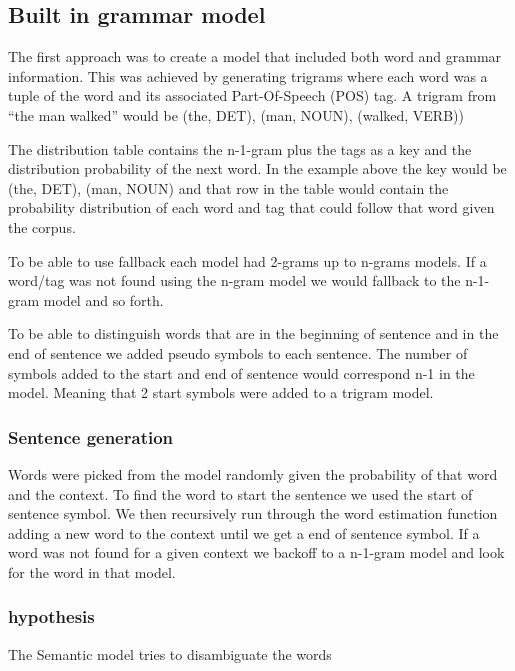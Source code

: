 \documentclass[a4paper,12pt]{article}
\begin{document}
\subsection{Built in grammar model}
The first approach was to create a model that included both word and grammar information. This was achieved by generating trigrams where each word was a tuple of the word and its associated Part-Of-Speech (POS) tag. A trigram from ``the man walked'' would be (the, DET), (man, NOUN), (walked, VERB))

The distribution table contains the n-1-gram plus the tags as a key and the distribution probability of the next word. In the example above the key would be (the, DET), (man, NOUN) and that row in the table would contain the probability distribution of each word and tag that could follow that word given the corpus.

To be able to use fallback each model had 2-grams up to n-grams models. If a word/tag was not found using the n-gram model we would fallback to the n-1-gram model and so forth.

To be able to distinguish words that are in the beginning of sentence and in the end of sentence we added pseudo symbols to each sentence. The number of symbols added to the start and end of sentence would correspond n-1 in the model. Meaning that 2 start symbols were added to a trigram model.

\subsubsection{Sentence generation}
Words were picked from the model randomly given the probability of that word and the context. To find the word to start the sentence we used the start of sentence symbol. We then recursively run through the word estimation function adding a new word to the context until we get a end of sentence symbol. If a word was not found for a given context we backoff to a n-1-gram model and look for the word in that model.

\subsubsection{hypothesis}
The Semantic model tries to disambiguate the words 
\end{document}
